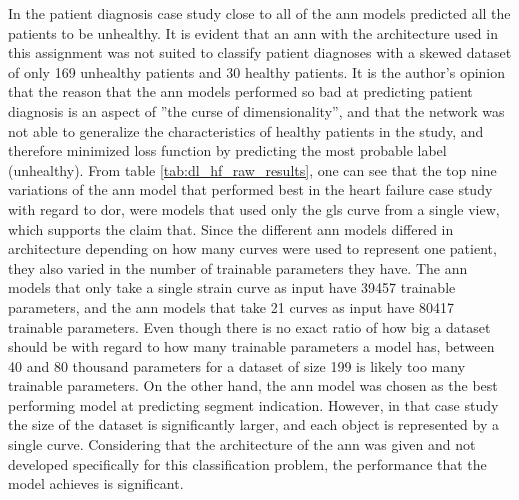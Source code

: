 In the patient diagnosis case study close to all of the \acrshort{ann} models predicted all the patients to be unhealthy. It is evident that an \acrshort{ann} with the architecture used in this assignment was not suited to classify patient diagnoses with a skewed dataset of only 169 unhealthy patients and 30 healthy patients. It is the author's opinion that the reason that the \acrshort{ann} models performed so bad at predicting patient diagnosis is an aspect of ''the curse of dimensionality'', and that the network was not able to generalize the characteristics of healthy patients in the study, and therefore minimized loss function by predicting the most probable label (unhealthy). From table \ref{tab:dl_hf_raw_results}, one can see that the top nine variations of the \acrshort{ann} model that performed best in the heart failure case study with regard to \acrshort{dor}, were models that used only the \acrshort{gls} curve from a single view, which supports the claim that. Since the different \acrshort{ann} models differed in architecture depending on how many curves were used to represent one patient, they also varied in the number of trainable parameters they have. The \acrshort{ann} models that only take a single strain curve as input have 39457 trainable parameters, and the \acrshort{ann} models that take 21 curves as input have 80417 trainable parameters. Even though there is no exact ratio of how big a dataset should be with regard to how many trainable parameters a model has, between 40 and 80 thousand parameters for a dataset of size 199 is likely too many trainable parameters. On the other hand, the \acrshort{ann} model was chosen as the best performing model at predicting segment indication. However, in that case study the size of the dataset is significantly larger, and each object is represented by a single curve. Considering that the architecture of the \acrshort{ann} was given and not developed specifically for this classification problem, the performance that the model achieves is significant. \bigskip
